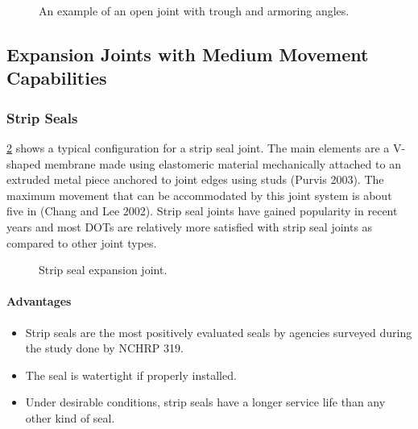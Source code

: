 \begin{figure}
  \caption{An example of an open joint with trough and armoring angles.}
  \label{fig:open-joint-trough-armoring-angles}
\end{figure}

\subsection{Expansion Joints with Medium Movement Capabilities}
\subsubsection*{Strip Seals}
\cref{fig:strip-seal-expansion-joint} shows a typical configuration for a strip seal joint. The main elements are a V-shaped membrane made
using elastomeric material mechanically attached to an extruded metal piece anchored to joint edges using studs
(Purvis 2003). The maximum movement that can be accommodated by this joint system is about five in (Chang and
Lee 2002). Strip seal joints have gained popularity in recent years and most DOTs are relatively more satisfied with
strip seal joints as compared to other joint types.

\begin{figure}
  \caption{Strip seal expansion joint.}
  \label{fig:strip-seal-expansion-joint}
\end{figure}

\paragraph*{Advantages}
\begin{itemize}
  \item  Strip seals are the most positively evaluated seals by agencies surveyed during the study done by NCHRP
  319.
  \item The seal is watertight if properly installed.
  \item Under desirable conditions, strip seals have a longer service life than any other kind of seal.
\end{itemize}

